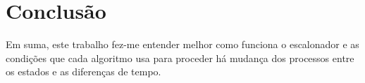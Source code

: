 \documentclass[11pt]{article}   %
\begin{document}
\section{Conclusão} %
Em suma, este trabalho fez-me entender melhor como funciona o escalonador e as condições que cada algoritmo usa para proceder há mudança dos processos entre os estados e as diferenças de tempo. 
\end{document}
